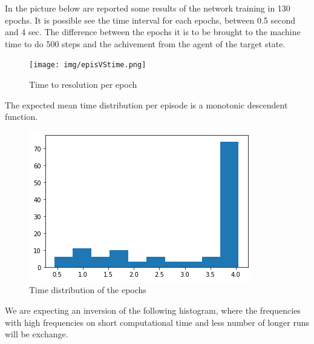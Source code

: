 In the picture below are reported some results of the network training in 130 epochs. It is possible see the time interval for each epochs, between 0.5 second and 4 sec. The difference between the epochs it is to be brought to the machine time to do 500 steps and the achivement from the agent of the target state.

\begin{figure}[h]
    \centering
    \texttt{[image: img/episVStime.png]}
    \caption{Time to resolution per epoch}
    \label{fig:my_label}
\end{figure}
The expected mean time distribution per episode is a monotonic descendent function. 
\begin{figure}[h]
    \centering
    \includegraphics[width=\linewidth]{img/histTimeEps.png}
    \caption{Time distribution of the epochs}
    \label{fig:my_label}
\end{figure}
We are expecting an inversion of the following histogram, where the frequencies with high frequencies on short computational time and less number of longer runs will be exchange. 

